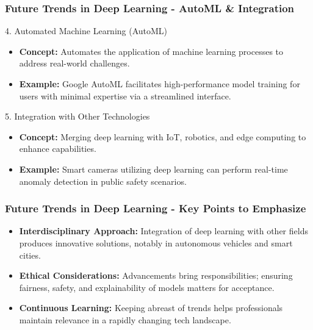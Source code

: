 \documentclass[aspectratio=169]{beamer}
\begin{document}
\begin{frame}[fragile]
    \frametitle{Future Trends in Deep Learning - AutoML & Integration}
    \begin{block}{4. Automated Machine Learning (AutoML)}
        \begin{itemize}
            \item \textbf{Concept:} Automates the application of machine learning processes to address real-world challenges.
            \item \textbf{Example:} Google AutoML facilitates high-performance model training for users with minimal expertise via a streamlined interface.
        \end{itemize}
    \end{block}

    \begin{block}{5. Integration with Other Technologies}
        \begin{itemize}
            \item \textbf{Concept:} Merging deep learning with IoT, robotics, and edge computing to enhance capabilities.
            \item \textbf{Example:} Smart cameras utilizing deep learning can perform real-time anomaly detection in public safety scenarios.
        \end{itemize}
    \end{block}
\end{frame}

\begin{frame}[fragile]
    \frametitle{Future Trends in Deep Learning - Key Points to Emphasize}
    \begin{itemize}
        \item \textbf{Interdisciplinary Approach:} Integration of deep learning with other fields produces innovative solutions, notably in autonomous vehicles and smart cities.
        \item \textbf{Ethical Considerations:} Advancements bring responsibilities; ensuring fairness, safety, and explainability of models matters for acceptance.
        \item \textbf{Continuous Learning:} Keeping abreast of trends helps professionals maintain relevance in a rapidly changing tech landscape.
    \end{itemize}
\end{frame}
\end{document}
